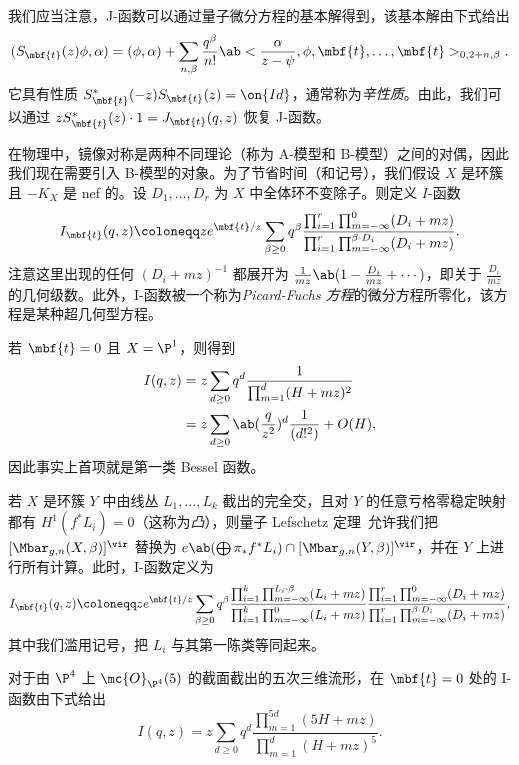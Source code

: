 我们应当注意，J-函数可以通过量子微分方程的基本解得到，该基本解由下式给出
\[ ( S_{\mbf{t}}(z) \phi , \alpha) = (\phi, \alpha) + \sum_{n, \beta} \frac{q^{\beta}}{n!} \ab<\frac{\alpha}{z-\psi}, \phi, \mbf{t}, \ldots, \mbf{t}>_{0, 2+n, \beta}. \]
它具有性质 \(S_{\mbf{t}}^*(-z) S_{\mbf{t}}(z) = \on{Id}\)，通常称为\textit{辛性质}。由此，我们可以通过 \(z S_{\mbf{t}}^*(z)\cdot 1 = J_{\mbf{t}}(q, z)\) 恢复 J-函数。

在物理中，镜像对称是两种不同理论（称为 A-模型和 B-模型）之间的对偶，因此我们现在需要引入 B-模型的对象。为了节省时间（和记号），我们假设 \(X\) 是环簇且 \(-K_X\) 是 nef 的。设 \(D_1, \ldots, D_r\) 为 \(X\) 中全体环不变除子。则定义 \(I\)-函数
\[
    I_{\mbf{t}}(q, z) \coloneqq z e^{\mbf{t}/z} \sum_{\beta \geq 0} q^{\beta} \frac{\prod_{i=1}^r \prod_{m = -\infty}^{0} (D_i + mz)}{\prod_{i=1}^r \prod_{m=-\infty}^{\beta \cdot D_i} (D_i + mz)}.
\]
注意这里出现的任何 \((D_i + mz)^{-1}\) 都展开为 \(\frac{1}{mz} \ab(1 - \frac{D_i}{mz} + \cdots)\)，即关于 \(\frac{D_i}{mz}\) 的几何级数。此外，I-函数被一个称为\textit{Picard-Fuchs 方程}的微分方程所零化，该方程是某种超几何型方程。

\begin{exm}
    若 \(\mbf{t} = 0\) 且 \(X = \P^1\)，则得到
    \begin{align*}
        I(q,z) &= z\sum_{d \geq 0} q^d \frac{1}{\prod_{m=1}^d (H + mz)^2} \\
        &= z\sum_{d \geq 0} \ab(\frac{q}{z^2})^d \frac{1}{(d!^2)} + O(H),
    \end{align*}
    因此事实上首项就是第一类 Bessel 函数。
\end{exm}

若 \(X\) 是环簇 \(Y\) 中由线丛 \(L_1, \ldots, L_k\) 截出的完全交，且对 \(Y\) 的任意亏格零稳定映射都有 \(H^1(f^* L_i) = 0\)（这称为\textit{凸}），则量子 Lefschetz 定理~\cite{CoatesGivental2007}允许我们把 \([\Mbar_{g,n}(X, \beta)]^{\vir}\) 替换为 \(e\ab(\bigoplus \pi_* f^* L_i) \cap [\Mbar_{g,n}(Y, \beta)]^{\vir}\)，并在 \(Y\) 上进行所有计算。此时，I-函数定义为
\[
    I_{\mbf{t}}(q,z) \coloneqq z e^{\mbf{t}/z} \sum_{\beta \geq 0} q^{\beta} \frac{\prod_{i=1}^k \prod_{m=-\infty}^{L_i \cdot \beta} (L_i + mz)}{\prod_{i=1}^k \prod_{m=-\infty}^{0} (L_i + mz)} \frac{\prod_{i=1}^r \prod_{m = -\infty}^{0} (D_i + mz)}{\prod_{i=1}^r \prod_{m=-\infty}^{\beta \cdot D_i} (D_i + mz)},
\]
其中我们滥用记号，把 \(L_i\) 与其第一陈类等同起来。

\begin{exm}
    对于由 \(\P^4\) 上 \(\mc{O}_{\P^4}(5)\) 的截面截出的五次三维流形，在 \(\mbf{t} = 0\) 处的 I-函数由下式给出
    \[ I(q,z) = z \sum_{d \geq 0} q^d \frac{\prod_{m=1}^{5d}(5H+mz)}{\prod_{m=1}^d (H+mz)^5}. \]
\end{exm}

